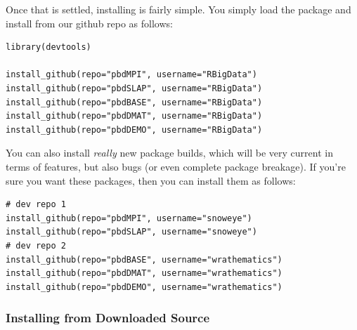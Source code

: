 Once that is settled, installing is fairly simple.  You simply load the  package and install from our github repo as follows:
\begin{lstlisting}[language=rr]
library(devtools)

install_github(repo="pbdMPI", username="RBigData")
install_github(repo="pbdSLAP", username="RBigData")
install_github(repo="pbdBASE", username="RBigData")
install_github(repo="pbdDMAT", username="RBigData")
install_github(repo="pbdDEMO", username="RBigData")
\end{lstlisting}

You can also install \emph{really} new package builds, which will be very current in terms of features, but also bugs (or even complete package breakage).  If you're sure you want these packages, then you can install them as follows:

\begin{lstlisting}[language=rr]
# dev repo 1
install_github(repo="pbdMPI", username="snoweye")
install_github(repo="pbdSLAP", username="snoweye")
# dev repo 2
install_github(repo="pbdBASE", username="wrathematics")
install_github(repo="pbdDMAT", username="wrathematics")
install_github(repo="pbdDEMO", username="wrathematics")
\end{lstlisting}



\subsubsection{Installing from Downloaded Source}

